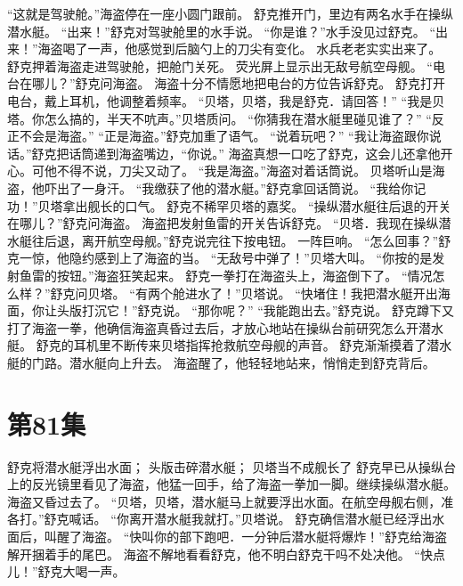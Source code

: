 \documentclass[a4paper,12pt,UTF8,twoside]{ctexbook}
\begin{document}
        “这就是驾驶舱。”海盗停在一座小圆门跟前。 
        舒克推开门，里边有两名水手在操纵潜水艇。 
        “出来！”舒克对驾驶舱里的水手说。 
        “你是谁？”水手没见过舒克。 
        “出来！”海盗喝了一声，他感觉到后脑勺上的刀尖有变化。 
        水兵老老实实出来了。 
        舒克押着海盗走进驾驶舱，把舱门关死。 
        荧光屏上显示出无敌号航空母舰。 
        “电台在哪儿？”舒克问海盗。 
        海盗十分不情愿地把电台的方位告诉舒克。 
        舒克打开电台，戴上耳机，他调整着频率。 
        “贝塔，贝塔，我是舒克．请回答！” 
        “我是贝塔。你怎么搞的，半天不吭声。”贝塔质问。 
        “你猜我在潜水艇里碰见谁了？” 
        “反正不会是海盗。” 
        “正是海盗。”舒克加重了语气。 
        “说着玩吧？” 
        “我让海盗跟你说话。”舒克把话筒递到海盗嘴边，“你说。” 
        海盗真想一口吃了舒克，这会儿还拿他开心。可他不得不说，刀尖又动了。 
        “我是海盗。”海盗对着话筒说。 
        贝塔听山是海盗，他吓出了一身汗。 
        “我缴获了他的潜水艇。”舒克拿回话筒说。 
        “我给你记功！”贝塔拿出舰长的口气。 
        舒克不稀罕贝塔的嘉奖。 
        “操纵潜水艇往后退的开关在哪儿？”舒克问海盗。 
        海盗把发射鱼雷的开关告诉舒克。 
        “贝塔．我现在操纵潜水艇往后退，离开航空母舰。”舒克说完往下按电钮。 
        一阵巨响。 
        “怎么回事？”舒克一惊，他隐约感到上了海盗的当。 
        “无敌号中弹了！”贝塔大叫。 
        “你按的是发射鱼雷的按钮。”海盗狂笑起来。 
        舒克一拳打在海盗头上，海盗倒下了。 
        “情况怎么样？”舒克问贝塔。 
        “有两个舱进水了！”贝塔说。 
        “快堵住！我把潜水艇开出海面，你让头版打沉它！”舒克说。 
        “那你呢？” 
        “我能跑出去。”舒克说。 
        舒克蹲下又打了海盗一拳，他确信海盗真昏过去后，才放心地站在操纵台前研究怎么开潜水艇。 
        舒克的耳机里不断传来贝塔指挥抢救航空母舰的声音。 
        舒克渐渐摸着了潜水艇的门路。潜水艇向上升去。 
        海盗醒了，他轻轻地站来，悄悄走到舒克背后。   \chapter{第81集} 
        舒克将潜水艇浮出水面； 
        头版击碎潜水艇； 
        贝塔当不成舰长了   
        舒克早已从操纵台上的反光镜里看见了海盗，他猛一回手，给了海盗一拳加一脚。继续操纵潜水艇。 
        海盗又昏过去了。 
        “贝塔，贝塔，潜水艇马上就要浮出水面。在航空母舰右侧，准各打。”舒克喊话。 
        “你离开潜水艇我就打。”贝塔说。 
        舒克确信潜水艇已经浮出水面后，叫醒了海盗。 
        “快叫你的部下跑吧．一分钟后潜水艇将爆炸！”舒克给海盗解开捆着手的尾巴。 
        海盗不解地看看舒克，他不明白舒克干吗不处决他。 
        “快点儿！”舒克大喝一声。 
\end{document}
